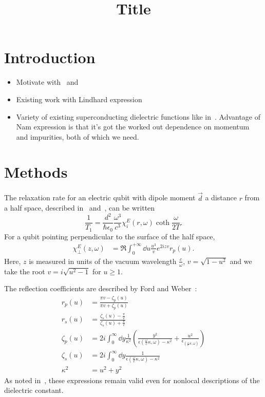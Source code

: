 \documentclass{article}
\title{Title}
\begin{document}
\maketitle

\section{Introduction \label{sec:intro}}
\begin{itemize}
	\item Motivate with~\cite{Tenberg2019} and~\cite{Kolkowitz2015}
	\item Existing work with Lindhard expression~\cite{QubitRelax}
	\item Variety of existing superconducting dielectric functions like in~\cite{AGD, llv9, Zimmermann1991, Mattis, Tinkham}.
	Advantage of Nam expression\cite{Nam1967} is that it's got the worked out dependence on momentum and impurities, both of which we need.
\end{itemize}
\section{Methods \label{sec:methods}}

	The relaxation rate for an electric qubit with dipole moment $\vec{d}$ a distance $r$ from a half space, described in~\cite{Henkel1999} and~\cite{QubitRelax}, can be written
	\begin{equation}
		\frac{1}{T_1} = \frac{d^2}{\hbar \epsilon_0} \frac{\omega^3}{c^3} \chi_{i}^{E}(r, \omega) \coth\frac{\omega}{2 T}.
	\end{equation}
	For a qubit pointing perpendicular to the surface of the half space,
	\begin{align}
		\chi_\perp^E(z, \omega) &= \Re \int_0^{+\infty} \dd{u} \frac{u^3}{v} e^{2 i z v} r_p(u). \label{eq:chi}
	\end{align}
	Here, $z$ is measured in units of the vacuum wavelength $\frac{c}{\omega}$, $v = \sqrt{1 - u^2}$ and we take the root $v = i \sqrt{u^2 - 1}$ for $u \geq 1$.

	The reflection coefficients are described by Ford and Weber~\cite{Ford1984}:
	\begin{align}
		r_p(u) &= \frac{\pi v - \zeta_p(u)}{\pi v + \zeta_p(u)} \\
		r_s(u) &= \frac{\zeta_s(u) - \frac{\pi}{v}}{\zeta_s(u) + \frac{\pi}{v}} \\
		\zeta_p(u) &= 2i \int_0^\infty \dd{y} \frac{1}{\kappa^2} \left( \frac{y^2}{\epsilon(\frac{\omega}{c}\kappa, \omega) - \kappa^2} + \frac{u^2}{\epsilon_(\frac{\omega}{c}\kappa, \omega)} \right) \label{eq:zp} \\
		\zeta_s(u) &= 2i \int_0^\infty \dd{y} \frac{1}{\epsilon(\frac{\omega}{c}\kappa, \omega) - \kappa^2} \label{eq:zs} \\
		\kappa^2 &= u^2 + y^2
	\end{align}
	As noted in~\cite{QubitRelax}, these expressions remain valid even for nonlocal descriptions of the dielectric constant.
\end{document}
